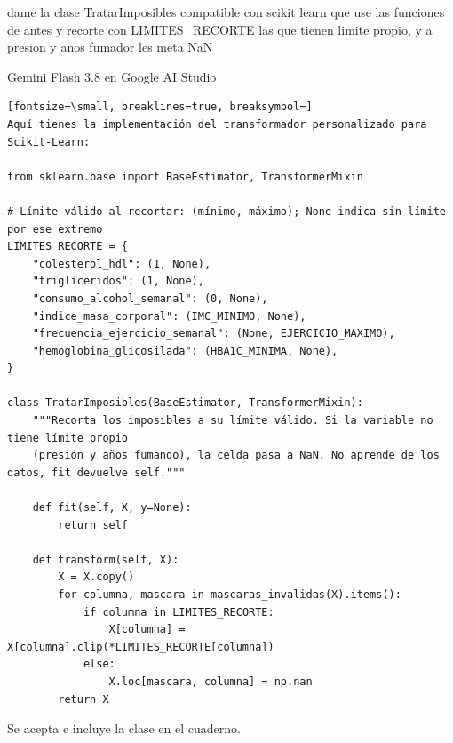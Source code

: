 \documentclass[12pt,a4paper,oneside]{book}
\begin{document}
\begin{iaprompt}
dame la clase TratarImposibles compatible con scikit learn que use las funciones de antes y recorte con LIMITES_RECORTE las que tienen limite propio, y a presion y anos fumador les meta NaN
\end{iaprompt}
\begin{iaresp}{Gemini Flash 3.8 en Google AI Studio}
\begin{Verbatim}[fontsize=\small, breaklines=true, breaksymbol=]
Aquí tienes la implementación del transformador personalizado para Scikit-Learn:

from sklearn.base import BaseEstimator, TransformerMixin

# Límite válido al recortar: (mínimo, máximo); None indica sin límite por ese extremo
LIMITES_RECORTE = {
    "colesterol_hdl": (1, None),
    "trigliceridos": (1, None),
    "consumo_alcohol_semanal": (0, None),
    "indice_masa_corporal": (IMC_MINIMO, None),
    "frecuencia_ejercicio_semanal": (None, EJERCICIO_MAXIMO),
    "hemoglobina_glicosilada": (HBA1C_MINIMA, None),
}

class TratarImposibles(BaseEstimator, TransformerMixin):
    """Recorta los imposibles a su límite válido. Si la variable no tiene límite propio 
    (presión y años fumando), la celda pasa a NaN. No aprende de los datos, fit devuelve self."""

    def fit(self, X, y=None):
        return self

    def transform(self, X):
        X = X.copy()
        for columna, mascara in mascaras_invalidas(X).items():
            if columna in LIMITES_RECORTE:
                X[columna] = X[columna].clip(*LIMITES_RECORTE[columna])
            else:
                X.loc[mascara, columna] = np.nan
        return X
\end{Verbatim}
\end{iaresp}
\begin{iaanalisis}
Se acepta e incluye la clase en el cuaderno.
\end{iaanalisis}
\end{document}

